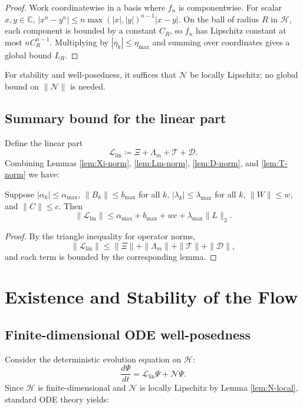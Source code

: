 \documentclass[11pt]{article}
\begin{document}
\begin{proof}
Work coordinatewise in a basis where \(f_n\) is componentwise. For scalar \(x,y\in\mathbb{C}\),
\(
|x^n - y^n|\le n \max(|x|,|y|)^{n-1}|x-y|.
\)
On the ball of radius \(R\) in \(\mathcal{H}\), each component is bounded by a constant \(C_R\), so \(f_n\) has Lipschitz constant at most \(n C_R^{n-1}\). Multiplying by \(|\eta_k|\le \eta_{\max}\) and summing over coordinates gives a global bound \(L_R\).
\end{proof}

For stability and well-posedness, it suffices that \(\mathcal{N}\) be locally Lipschitz; no global bound on \(\|\mathcal{N}\|\) is needed.

\subsection{Summary bound for the linear part}

Define the linear part
\[
\mathcal{L}_{\mathrm{lin}} \coloneqq \Xi + \Lambda_m + \mathcal{T} + \mathcal{D}.
\]
Combining Lemmas \ref{lem:Xi-norm}, \ref{lem:Lm-norm}, \ref{lem:D-norm}, and \ref{lem:T-norm} we have:

\begin{proposition}
\label{prop:Llin-bound}
Suppose \(|\alpha_k|\le \alpha_{\max}\), \(\|B_k\|\le b_{\max}\) for all \(k\), \(|\lambda_k|\le \lambda_{\max}\) for all \(k\), \(\|W\|\le w\), and \(\|C\|\le c\). Then
\[
\|\mathcal{L}_{\mathrm{lin}}\|
\le
\alpha_{\max} + b_{\max} + w c + \lambda_{\max}\|L\|_2.
\]
\end{proposition}

\begin{proof}
By the triangle inequality for operator norms,
\[
\|\mathcal{L}_{\mathrm{lin}}\|
\le
\|\Xi\| + \|\Lambda_m\| + \|\mathcal{T}\| + \|\mathcal{D}\|,
\]
and each term is bounded by the corresponding lemma.
\end{proof}

\section{Existence and Stability of the Flow}

\subsection{Finite-dimensional ODE well-posedness}

Consider the deterministic evolution equation on \(\mathcal{H}\):
\begin{equation}
\frac{d\Psi}{dt} = \mathcal{L}_{\mathrm{lin}} \Psi + \mathcal{N}\Psi.
\label{eq:ODE-abstract}
\end{equation}
Since \(\mathcal{H}\) is finite-dimensional and \(\mathcal{N}\) is locally Lipschitz by Lemma \ref{lem:N-local}, standard ODE theory yields:
\end{document}
